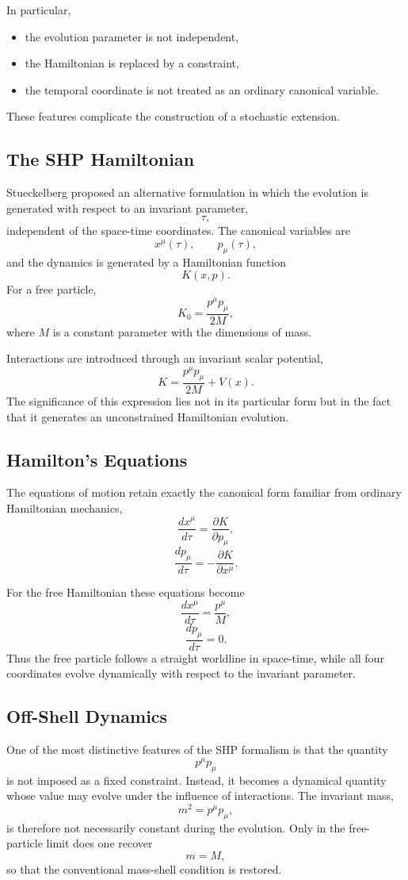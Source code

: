 In particular,
\begin{itemize}
\item the evolution parameter is not independent,
\item the Hamiltonian is replaced by a constraint,
\item the temporal coordinate is not treated as an ordinary canonical
variable.
\end{itemize}
These features complicate the construction of a stochastic extension.
\subsection{The SHP Hamiltonian}
Stueckelberg proposed an alternative formulation in which the evolution
is generated with respect to an invariant parameter,
\[\tau,\]
independent of the space-time coordinates.
The canonical variables are
\[x^\mu(\tau),\qquad p_\mu(\tau),\]
and the dynamics is generated by a Hamiltonian function
\[K(x,p).\]
For a free particle,
\[\boxed{K_0=\frac{p^\mu p_\mu}{2M},}\]
where \(M\) is a constant parameter with the dimensions of mass.

Interactions are introduced through an invariant scalar potential,
\[K=\frac{p^\mu p_\mu}{2M}+V(x).\]
The significance of this expression lies not in its particular form but
in the fact that it generates an unconstrained Hamiltonian evolution.
\subsection{Hamilton's Equations}
The equations of motion retain exactly the canonical form familiar from
ordinary Hamiltonian mechanics,
\[\boxed{\frac{dx^\mu}{d\tau}=\frac{\partial K}{\partial p_\mu},}\]
\[\boxed{\frac{dp_\mu}{d\tau}=-\frac{\partial K}{\partial x^\mu}.}\]

For the free Hamiltonian these equations become
\[\frac{dx^\mu}{d\tau}=\frac{p^\mu}{M},\]
\[\frac{dp_\mu}{d\tau}=0.\]
Thus the free particle follows a straight worldline in space-time, while
all four coordinates evolve dynamically with respect to the invariant
parameter.
\subsection{Off-Shell Dynamics}
One of the most distinctive features of the SHP formalism is that the
quantity
\[p^\mu p_\mu\]
is not imposed as a fixed constraint.
Instead, it becomes a dynamical quantity whose value may evolve under the
influence of interactions.
The invariant mass,
\[m^2=p^\mu p_\mu ,\]
is therefore not necessarily constant during the evolution.
Only in the free-particle limit does one recover
\[m=M,\]
so that the conventional mass-shell condition is restored.

